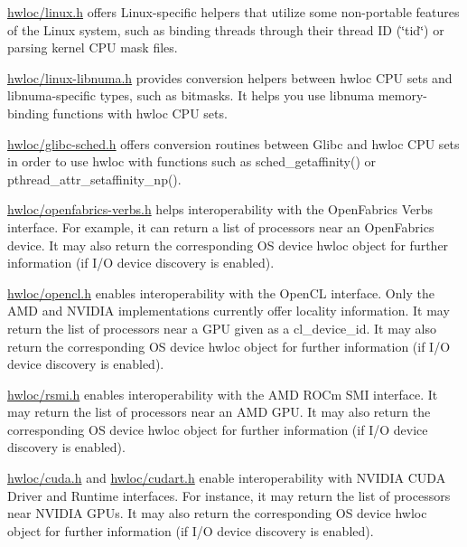\begin{DoxyDescription}
\item[Linux specific features ]\hyperlink{a00140_source}{hwloc/linux.\+h} offers Linux-\/specific helpers that utilize some non-\/portable features of the Linux system, such as binding threads through their thread ID (\char`\"{}tid\char`\"{}) or parsing kernel C\+PU mask files. 


\item[Linux libnuma ]\hyperlink{a00143_source}{hwloc/linux-\/libnuma.\+h} provides conversion helpers between hwloc C\+PU sets and libnuma-\/specific types, such as bitmasks. It helps you use libnuma memory-\/binding functions with hwloc C\+PU sets. 


\item[Glibc ]\hyperlink{a00146_source}{hwloc/glibc-\/sched.\+h} offers conversion routines between Glibc and hwloc C\+PU sets in order to use hwloc with functions such as sched\+\_\+getaffinity() or pthread\+\_\+attr\+\_\+setaffinity\+\_\+np(). 


\item[Open\+Fabrics Verbs ]\hyperlink{a00167_source}{hwloc/openfabrics-\/verbs.\+h} helps interoperability with the Open\+Fabrics Verbs interface. For example, it can return a list of processors near an Open\+Fabrics device. It may also return the corresponding OS device hwloc object for further information (if I/O device discovery is enabled). 


\item[Open\+CL ]\hyperlink{a00149_source}{hwloc/opencl.\+h} enables interoperability with the Open\+CL interface. Only the A\+MD and N\+V\+I\+D\+IA implementations currently offer locality information. It may return the list of processors near a G\+PU given as a {\ttfamily cl\+\_\+device\+\_\+id}. It may also return the corresponding OS device hwloc object for further information (if I/O device discovery is enabled). 


\item[A\+MD R\+O\+Cm S\+MI Library (R\+S\+MI) ]\hyperlink{a00161_source}{hwloc/rsmi.\+h} enables interoperability with the A\+MD R\+O\+Cm S\+MI interface. It may return the list of processors near an A\+MD G\+PU. It may also return the corresponding OS device hwloc object for further information (if I/O device discovery is enabled). 


\item[N\+V\+I\+D\+IA C\+U\+DA ]\hyperlink{a00152_source}{hwloc/cuda.\+h} and \hyperlink{a00155_source}{hwloc/cudart.\+h} enable interoperability with N\+V\+I\+D\+IA C\+U\+DA Driver and Runtime interfaces. For instance, it may return the list of processors near N\+V\+I\+D\+IA G\+P\+Us. It may also return the corresponding OS device hwloc object for further information (if I/O device discovery is enabled). 



\end{DoxyDescription}
